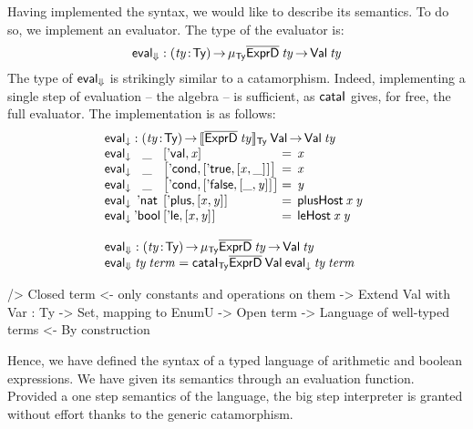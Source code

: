 Having implemented the syntax, we would like to describe its
semantics. To do so, we implement an evaluator. The type of the
evaluator is:
%
\[
\evalH : \PI{\V{ty}}{\Ty} 
         \IMu{\Ty}{\toIDesc{\HExprD}}{\V{ty}} \To
         \Val{\V{ty}}
\]
%
The type of $\evalH$ is strikingly similar to a
catamorphism. Indeed, implementing a single step of evaluation -- the
algebra -- is sufficient, as $\cataI$ gives, for free, the full
evaluator. The implementation is as follows:
%
\[\stk{
\evalOne : \PI{\V{ty}}{\Ty} \idescop{\toIDesc{\HExprD}\:\V{ty}}{\Ty}{\SYMBVal}
           \To {\Val{\V{ty}}} \\
\begin{array}{@{}l@{}c@{}l@{\:=\:\:}l}
\evalOne\: & \_\: & \pair{\SYMBEval}{\V{x}}{}                                             & \V{x} \\
\evalOne\: & \_\: & \pair{\SYMBEcond}{\pair{\BoolTrue}{\pair{\V{x}}{\_}{}}{}}{}   & \V{x} \\
\evalOne\: & \_\: & \pair{\SYMBEcond}{\pair{\BoolFalse}{\pair{\_}{\V{y}}{}}{}}{}  & \V{y} \\
\evalOne\: & \Enat\: & \pair{\SYMBEplus}{\pair{\V{x}}{\V{y}}{}}{}                     & \F{plusHost}\: \V{x}\: \V{y} \\
\evalOne\: & \Ebool\: & \pair{\SYMBEle}{\pair{\V{x}}{\V{y}}{}}{}                      & \F{leHost}\: \V{x}\: \V{y} 
\end{array} \\
\\
\evalH : \PI{\V{ty}}{\Ty} 
           \IMu{\Ty}{\toIDesc{\HExprD}}{\V{ty}} \To
           \Val{\V{ty}} \\
\evalH\: \V{ty}\: \V{term} = \cataI_{\Ty}
                                 \toIDesc{\HExprD}\: 
                                 \SYMBVal\: 
                                 \evalOne\: 
                                 \V{ty}\: 
                                 \V{term}
}\]

\begin{wstructure}
    /> Closed term
        <- only constants and operations on them
        -> Extend Val with Var : Ty -> Set, mapping to EnumU
            -> Open term
            -> Language of well-typed terms
                <- By construction
\end{wstructure}

Hence, we have defined the syntax of a typed language of arithmetic
and boolean expressions. We have given its semantics through an
evaluation function. Provided a one step semantics of the language, the
big step interpreter is granted without effort thanks to the generic
catamorphism.

